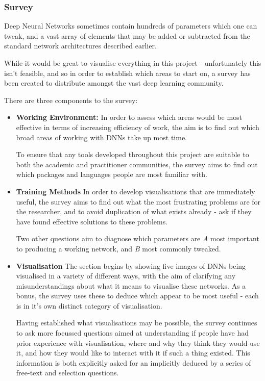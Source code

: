 \documentclass[a4paper,11pt,titlepage]{article}
\begin{document}
		\subsubsection{Survey}
		Deep Neural Networks sometimes contain hundreds of parameters which one can tweak, and a vast array of elements that may be added or subtracted from the standard network architectures described earlier.
		\par 
		While it would be great to visualise everything in this project - unfortunately this isn't feasible, and so in order to establish which areas to start on, a survey has been created to distribute amongst the vast deep learning community. 
		\par 
		There are three components to the survey:
		\begin{itemize}
			\item \textbf{Working Environment:}
		In order to assess which areas would be most effective in terms of increasing efficiency of work, the aim is to find out which broad areas of working with DNNs take up most time.
		\par 
		To ensure that any tools developed throughout this project are suitable to both the academic and practitioner communities, the survey aims to find out which packages and languages people are most familiar with.
			\item \textbf{Training Methods}
		In order to develop visualisations that are immediately useful, the survey aims to find out what the most frustrating problems are for the researcher, and to avoid duplication of what exists already - ask if they have found effective solutions to these problems.
		\par
		Two other questions aim to diagnose which parameters are \textit{A} most important to producing a working network, and \textit{B} most commonly tweaked.
			\item \textbf{Visualisation}
		The section begins by showing five images of DNNs being visualised in a variety of different ways, with the aim of clarifying any misunderstandings about what it means to visualise these networks. As a bonus, the survey uses these to deduce which appear to be most useful - each is in it's own distinct category of visualisation.
		\par 
		Having established what visualisations may be possible, the survey continues to ask more focussed questions aimed at understanding if people have had prior experience with visualisation, where and why they think they would use it, and how they would like to interact with it if such a thing existed. This information is both explicitly asked for an implicitly deduced by a series of free-text and selection questions.
		
		\end{itemize}
		\par
		
\end{document}
